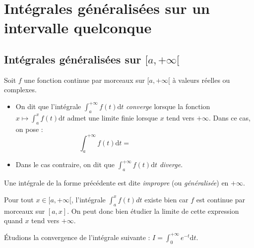 \documentclass[french,11pt,twoside]{VcCours}
\newcommand{\dt}{\text{d}t}
\begin{document}
\section{Intégrales généralisées sur un intervalle quelconque}
\subsection{Intégrales généralisées sur \texorpdfstring{$[a,+\infty[$}{[a,+∞[}}

\begin{Definition}{}
Soit $f$ une fonction continue par morceaux sur $[a,+\infty[$ à valeurs réelles ou complexes.
\begin{itemize}
\item On dit que l'intégrale $\int_a^{+\infty} f(t)\dt$ \emph{converge} lorsque la fonction $x \mapsto \int_a^x f(t) \dt$ admet une limite finie lorsque $x$ tend vers $+\infty$. Dans ce cas, on pose :
\[ \int_a^{+\infty} f(t) \dt = \phantom{\lim_{x\to +\infty} \int_a^x f(t)\dt} \]
\item Dans le cas contraire, on dit que $\int_a^{+\infty} f(t)\dt$ \emph{diverge}.
\end{itemize}
\end{Definition}

Une intégrale de la forme précédente est dite \emph{impropre} (ou \emph{généralisée}) en $+ \infty$.

\begin{Remarque}{} 
Pour tout $x \in [a, + \infty[$, l'intégrale $\int_{a}^x f(t) dt$ existe bien car $f$ est continue par morceaux sur $[a,x]$. On peut donc bien étudier la limite de cette expression quand $x$ tend vers $+\infty$.
\end{Remarque}

\newpage
\begin{Exemple}
Étudions la convergence de l'intégrale suivante : $I = \int_{0}^{+ \infty} e^{-t} \dt$. 


\vspace{6cm}
\end{Exemple} 
\end{document}
